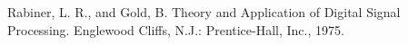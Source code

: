 \documentclass[informe.tex]{subfiles}
\begin{document}
Rabiner, L. R., and Gold, B. Theory and Application of Digital Signal Processing. Englewood Cliffs,
N.J.: Prentice-Hall, Inc., 1975.\newline
\end{document}
